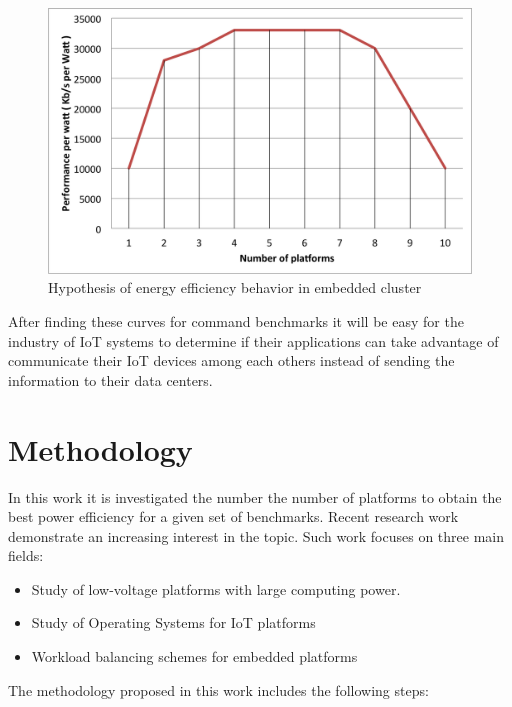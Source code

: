 \begin{figure}[H] \centering
\includegraphics[width=1\textwidth]{images/hypothesys.png}
\caption{Hypothesis of energy efficiency behavior in embedded cluster}
\label{fig:1.2} \end{figure}

After finding these curves for command benchmarks it will be easy for the
industry of IoT systems to determine if their applications can take advantage
of communicate their IoT devices among each others instead of sending the
information to their data centers.

\section{Methodology} \noindent

In this work it is investigated the number the number of platforms to obtain
the best power efficiency for a given set of benchmarks. Recent research work 
\cite{Saldana} \cite{Abgaria} \cite{McMahon} \cite{Liu} demonstrate an
increasing interest in the topic. Such work focuses on three main fields:

\begin{itemize} 
    \item Study of low-voltage platforms with large computing power.
    \item Study of Operating Systems for IoT platforms
    \item Workload balancing schemes for embedded platforms
\end{itemize}

The methodology proposed in this work includes the following steps:


